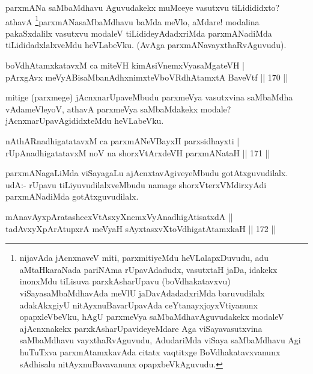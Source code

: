 \begin{artha}
parxmANa saMbaMdhavu Aguvudakekx muMceye vasutxvu tiLidididxto? athavA \footnote{nijavAda jAcnxnaveV miti, parxmitiyeMdu heVLalapxDuvudu, adu aMtaHkaraNada pariNAma rUpavAdadudx, vasutxtaH jaDa, idakekx inonxMdu tiLisuva parxkAsharUpavu (boVdhakatavxvu) viSayasaMbaMdhavAda meVlU jaDavAdadadxriMda baruvudilalx adakAkxgiyU nitAyxnuBavarUpavAda ceYtanayxjoyxVtiyanunx opapxleVbeVku, hAgU parxmeVya saMbaMdhavAguvudakekx modaleV ajAcnxnakekx parxkAsharUpavideyeMdare Aga viSayavasutxvina saMbaMdhavu vayxthaRvAguvudu, AdudariMda viSaya saMbaMdhavu Agi huTuTxva parxmAtamxkavAda citatx vaqtitxge BoVdhakatavxvanunx sAdhisalu nitAyxnuBavavanunx opapxbeVkAguvudu.}parxmANasaMbaMdhavu baMda meVlo, aMdare! modalina pakaSxdalilx vasutxvu modaleV tiLidideyAdadxriMda parxmANadiMda tiLididadxlalxveMdu heVLabeVku. (AvAga parxmANavayxthaRvAguvudu).
\end{artha}

\begin{shl}
boVdhAtamxkatavxM ca miteVH kimAsiVnemxVyasaMgateVH | \\
pArxgAvx meVyABisaMbanAdhxnimxteVboVRdhAtamxtA BaveVtf \hfill||  170 ||  
\end{shl}

\begin{artha}
mitige (parxmege) jAcnxnarUpaveMbudu parxmeVya vasutxvina saMbaMdha vAdameVleyoV, athavA parxmeVya saMbaMdakekx modale? jAcnxnarUpavAgididxteMdu heVLabeVku.
\end{artha}


\begin{shl}
nAthARnadhigatatavxM ca parxmANeVBayxH parxsidhayxti | \\
rUpAnadhigatatavxM noV na shorxVtArxdeVH parxmANataH \hfill||  171 ||  
\end{shl}

\begin{artha}
parxmANagaLiMda viSayagaLu ajAcnxtavAgiveyeMbudu gotAtxguvudilalx. udA:- rUpavu tiLiyuvudilalxveMbudu namage shorxVterxVMdirxyAdi parxmANadiMda gotAtxguvudilalx.
\end{artha}

\begin{shl}
mAnavAyxpAratashecxVtAsxyXnemxVyAnadhigAtisatxdA ||  \\
tadAvxyXpArAtupxrA meVyaH sAyxtasxvXtoVdhigatAtamxkaH \hfill||  172 ||  
\end{shl}


